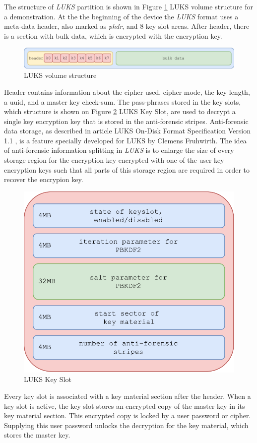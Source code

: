 The structure of {\it LUKS} partition is shown in Figure \ref{fig_luksvol} LUKS volume structure for a demonstration.
At the the beginning of the device the {\it LUKS} format uses a meta-data header, also marked as {\it phdr}, and 8 key slot areas.
After header, there is a section with bulk data, which is encrypted with the encryption key.
\begin{figure}[h]
    \centering
    \includegraphics[scale=0.7]{figures/LUKSdrive.pdf}
    \caption{LUKS volume structure}
    \label{fig_luksvol}
\end{figure}
Header contains information about the cipher used, cipher mode, the key length, a uuid, and a master key check-sum.
The pass-phrases stored in the key slots, which structure is shown on Figure \ref{fig_luksslot} LUKS Key Slot, are used to decrypt a single key encryption key that is stored in the anti-forensic stripes.
Anti-forensic data storage, as described in article LUKS On-Disk Format Specification Version 1.1 \cite{fruhwirth2005luks}, is a feature specially developed for LUKS by Clemens Fruhwirth.
The idea of anti-forensic information splitting in {\it LUKS} is to enlarge the size of every storage region for the encryption key encrypted with one of the user key encryption keys such that all parts of this storage region are required in order to recover the encrypion key.

\begin{figure}[h]
    \centering
    \includegraphics[scale=0.6]{figures/LUKSkeyslot.pdf}
    \caption{LUKS Key Slot}
    \label{fig_luksslot}
\end{figure}
Every key slot is associated with a key material section after the header.
When a key slot is active, the key slot stores an encrypted copy of the master key in its key material section.
This encrypted copy is locked by a user password or cipher.
Supplying this user password unlocks the decryption for the key material, which stores the master key.



